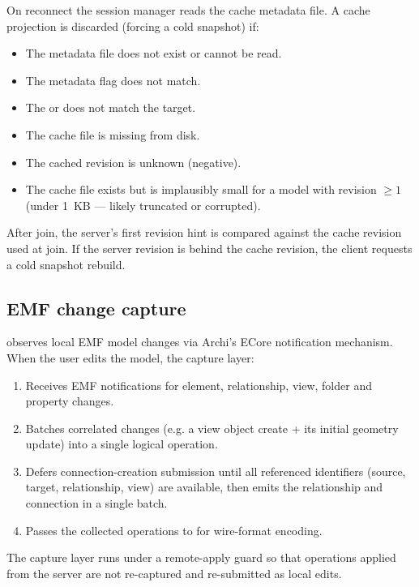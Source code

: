 On reconnect the session manager reads the cache metadata file. A cache
projection is discarded (forcing a cold snapshot) if:

\begin{itemize}
\item The metadata file does not exist or cannot be read.
\item The metadata  flag does not match.
\item The  or  does not match the target.
\item The cache file is missing from disk.
\item The cached revision is unknown (negative).
\item The cache file exists but is implausibly small for a model with
  revision \(\geq 1\) (under 1~KB --- likely truncated or corrupted).
\end{itemize}

After join, the server's first revision hint is compared against the cache
revision used at join. If the server revision is behind the cache revision,
the client requests a cold snapshot rebuild.

\subsection{EMF change capture}

 observes local EMF model changes via Archi's
ECore notification mechanism. When the user edits the model, the capture
layer:

\begin{enumerate}
\item Receives EMF notifications for element, relationship, view, folder
  and property changes.
\item Batches correlated changes (e.g. a view object create + its initial
  geometry update) into a single logical operation.
\item Defers connection-creation submission until all referenced identifiers
  (source, target, relationship, view) are available, then emits the
  relationship and connection in a single  batch.
\item Passes the collected operations to  for wire-format
  encoding.
\end{enumerate}

The capture layer runs under a remote-apply guard so that operations applied
from the server are not re-captured and re-submitted as local edits.

